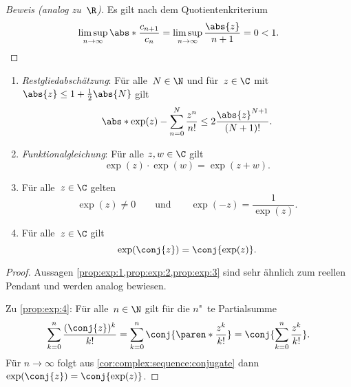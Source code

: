 \documentclass[a4paper]{article}
\begin{document}
\begin{proof}[Beweis (analog zu~$\R$)]
    Es gilt nach dem Quotientenkriterium
    \begin{equation*}
        \limsup_{n\to\infty} \abs*{\frac{c_{n+1}}{c_n}} = \limsup_{n\to\infty} \frac{\abs{z}}{n+1} = 0 < 1. \qedhere
    \end{equation*}
\end{proof}

\begin{proposition}\label{prop:complex:exp:properties}\leavevmode
    \begin{enumerate}
        \item \emph{Restgliedabschätzung}: Für alle~$N \in \N$ und für~$z \in \C$ mit~$\abs{z} \leq 1+\frac{1}{2}\abs{N}$ gilt
              \begin{equation*}
                  \abs*{\exp(z) - \sum_{n=0}^N \frac{z^n}{n!}} \leq 2\frac{\abs{z}^{N+1}}{(N+1)!}.
              \end{equation*}\label{prop:exp:1}
        \item \emph{Funktionalgleichung}: Für alle $z, w \in \C$ gilt
              \begin{equation*}
                  \exp(z) \cdot \exp(w) = \exp(z+w).
              \end{equation*}\label{prop:exp:2}
        \item Für alle~$z \in \C$ gelten
              \begin{equation*}
                  \exp(z) \neq 0 \qquad\text{und}\qquad \exp(-z) = \frac{1}{\exp(z)}.
              \end{equation*}\label{prop:exp:3}
        \item Für alle~$z \in \C$ gilt
              \begin{equation*}
                  \exp(\conj{z}) = \conj{\exp(z)}.
              \end{equation*}\label{prop:exp:4}
    \end{enumerate}
\end{proposition}

\begin{proof}
    Aussagen \cref{prop:exp:1,prop:exp:2,prop:exp:3} sind sehr ähnlich zum reellen Pendant und werden analog bewiesen.

    Zu \cref{prop:exp:4}: Für alle~$n \in \N$ gilt für die $n$"~te Partialsumme
    \begin{equation*}
        \sum_{k=0}^n \frac{(\conj{z})^k}{k!} = \sum_{k=0}^n \conj{\paren*{\frac{z^k}{k!}}} = \conj{\sum_{k=0}^n \frac{z^k}{k!}}.
    \end{equation*}
    Für $n \to \infty$ folgt aus \cref{cor:complex:sequence:conjugate} dann $\exp(\conj{z}) = \conj{\exp(z)}$.
\end{proof}
\end{document}

